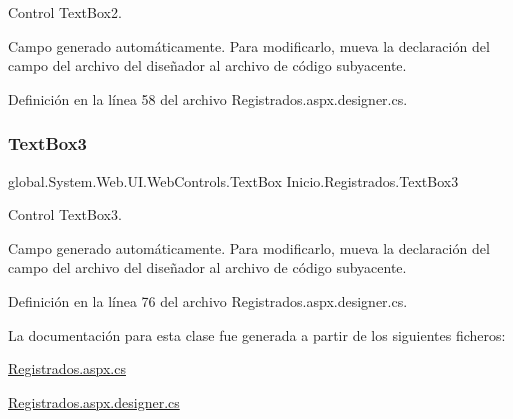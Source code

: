 Control Text\+Box2. 

Campo generado automáticamente. Para modificarlo, mueva la declaración del campo del archivo del diseñador al archivo de código subyacente. 

Definición en la línea 58 del archivo Registrados.\+aspx.\+designer.\+cs.

\mbox{\label{classInicio_1_1Registrados_a42dd2c03767d9a49a113c1c4e864d790}} 
\subsubsection{\texorpdfstring{TextBox3}{TextBox3}}
{\footnotesize\ttfamily global.\+System.\+Web.\+U\+I.\+Web\+Controls.\+Text\+Box Inicio.\+Registrados.\+Text\+Box3\hspace{0.3cm}{\ttfamily [protected]}}



Control Text\+Box3. 

Campo generado automáticamente. Para modificarlo, mueva la declaración del campo del archivo del diseñador al archivo de código subyacente. 

Definición en la línea 76 del archivo Registrados.\+aspx.\+designer.\+cs.



La documentación para esta clase fue generada a partir de los siguientes ficheros\+:\begin{DoxyCompactItemize}
\item 
\mbox{\hyperlink{Registrados_8aspx_8cs}{Registrados.\+aspx.\+cs}}\item 
\mbox{\hyperlink{Registrados_8aspx_8designer_8cs}{Registrados.\+aspx.\+designer.\+cs}}\end{DoxyCompactItemize}
